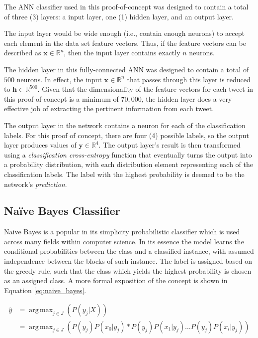 \documentclass[conference]{sig-alternate-05-2015}
\DeclareMathOperator*{\argmax}{arg\,max}
\begin{document}
The ANN classifier used in this proof-of-concept was designed to contain a total
of three (3) layers: a input layer, one (1) hidden layer, and an output layer.

The input layer would be wide enough (i.e., contain enough
neurons) to accept each element in the data set feature vectors. Thus, if the
feature vectors can be described as $\textbf{x} \in \mathbb{R}^n$, then the
input layer contains exactly $n$ neurons. 

The hidden layer in this fully-connected ANN was designed to contain a total of
$500$ neurons. In effect, the input $\textbf{x} \in \mathbb{R}^n$ that passes
through this layer is reduced to $\textbf{h} \in \mathbb{R}^{500}$. Given that
the dimensionality of the feature vectors for each tweet in this
proof-of-concept is a minimum of $70,000$, the hidden layer does a very
effective job of extracting the pertinent information from each tweet.

The output layer in the network contains a neuron for each of the classification
labels. For this proof of concept, there are four (4) possible labels, so the
output layer produces values of $\textbf{y} \in \mathbb{R}^4$. The output
layer's result is then transformed using a \textit{classification cross-entropy}
function that eventually turns the output into a probability distribution, with
each distribution element representing each of the classification labels. The
label with the highest probability is deemed to be the network's
\textit{prediction}.

\subsection{Na\"ive Bayes Classifier}\label{subsec:naive_bayes_classifer}

Naive Bayes is a popular in its simplicity probabilistic classifier which is
used across many fields within computer science. In its essence the model learns
the conditional probabilities between the class and a classified instance, with
assumed independence between the blocks of such instance. The label is assigned
based on the greedy rule, such that the class which yields the highest
probability is chosen as an assigned class. A more formal exposition of the
concept is shown in Equation \ref{eq:naive_bayes}.\par

\noindent\hrulefill
\begin{equation}
  \label{eq:naive_bayes}
  \begin{aligned}
    \hat{y}&=\argmax_{j \in J}(P(y_j|X)) \\
    &=\argmax_{j\in J}(P(y_j)P(x_0 | y_j) * P(y_j)P(x_1 | y_j) \ldots P(y_j)P(x_i | y_j) )
  \end{aligned}
\end{equation}
\end{document}
